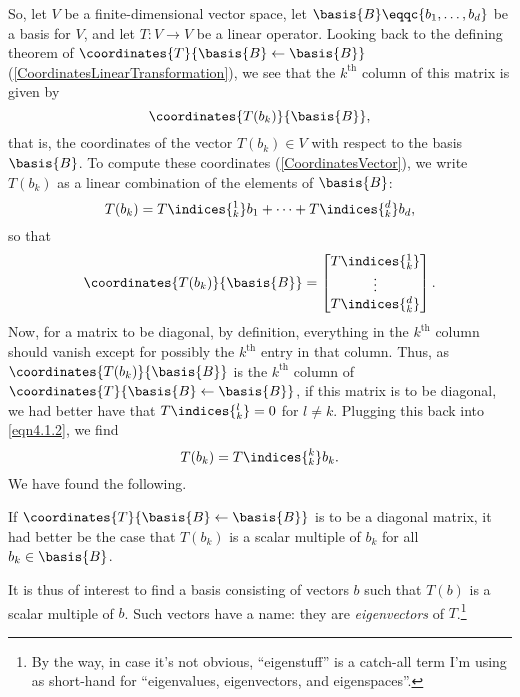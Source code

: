 So, let $V$ be a finite-dimensional vector space, let $\basis{B}\eqqc \{ b_1,\ldots ,b_d\}$ be a basis for $V$, and let $T\colon V\rightarrow V$ be a linear operator.  Looking back to the defining theorem of $\coordinates{T}{\basis{B}\leftarrow \basis{B}}$ (\cref{CoordinatesLinearTransformation}), we see that the $k^{\text{th}}$ column of this matrix is given by
\begin{equation}
	\coordinates{T(b_k)}{\basis{B}},
\end{equation}
that is, the coordinates of the vector $T(b_k)\in V$ with respect to the basis $\basis{B}$.  To compute these coordinates (\cref{CoordinatesVector}), we write $T(b_k)$ as a linear combination of the elements of $\basis{B}$:
\begin{equation}\label{eqn4.1.2}
	T(b_k)=T\indices{^1_k}b_1+\cdots +T\indices{^d_k}b_d,
\end{equation}
so that
\begin{equation}
	\coordinates{T(b_k)}{\basis{B}}=\begin{bmatrix}T\indices{^1_k} \\ \vdots \\ T\indices{^d_k}\end{bmatrix}.
\end{equation}
Now, for a matrix to be diagonal, by definition, everything in the $k^{\text{th}}$ column should vanish except for possibly the $k^{\text{th}}$ entry in that column.  Thus, as $\coordinates{T(b_k)}{\basis{B}}$ is the $k^{\text{th}}$ column of $\coordinates{T}{\basis{B}\leftarrow \basis{B}}$, if this matrix is to be diagonal, we had better have that $T\indices{^l_k}=0$ for $l\neq k$.  Plugging this back into \eqref{eqn4.1.2}, we find
\begin{equation}
	T(b_k)=T\indices{^k_k}b_k.
\end{equation}
We have found the following.
\begin{important}
	If $\coordinates{T}{\basis{B}\leftarrow \basis{B}}$ is to be a diagonal matrix, it had better be the case that $T(b_k)$ is a scalar multiple of $b_k$ for all $b_k\in \basis{B}$.
\end{important}

It is thus of interest to find a basis consisting of vectors $b$ such that $T(b)$ is a scalar multiple of $b$.  Such vectors have a name:  they are \emph{eigenvectors} of $T$.\footnote{By the way, in case it's not obvious, ``eigenstuff'' is a catch-all term I'm using as short-hand for ``eigenvalues, eigenvectors, and eigenspaces''.}

